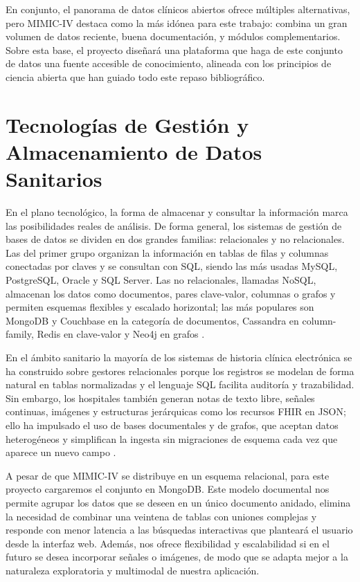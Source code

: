 \newpage
En conjunto, el panorama de datos clínicos abiertos ofrece múltiples alternativas, pero MIMIC-IV destaca como la más idónea para este trabajo: combina un gran volumen de datos reciente, buena documentación, y módulos complementarios. Sobre esta base, el proyecto diseñará una plataforma que haga de este conjunto de datos una fuente accesible de conocimiento, alineada con los principios de ciencia abierta que han guiado todo este repaso bibliográfico.


\section{Tecnologías de Gestión y Almacenamiento de Datos Sanitarios}




En el plano tecnológico, la forma de almacenar y consultar la información marca las posibilidades reales de análisis. De forma general, los sistemas de gestión de bases de datos se dividen en dos grandes familias: relacionales y no relacionales. Las del primer grupo organizan la información en tablas de filas y columnas conectadas por claves y se consultan con SQL, siendo las más usadas MySQL, PostgreSQL, Oracle y SQL Server.  Las no relacionales, llamadas NoSQL, almacenan los datos como documentos, pares clave-valor, columnas o grafos y permiten esquemas flexibles y escalado horizontal; las más populares son MongoDB y Couchbase en la categoría de documentos, Cassandra en column-family, Redis en clave-valor y Neo4j en grafos \cite{DBEngines2025}.

En el ámbito sanitario la mayoría de los sistemas de historia clínica electrónica se ha construido sobre gestores relacionales porque los registros se modelan de forma natural en tablas normalizadas y el lenguaje SQL facilita auditoría y trazabilidad.  Sin embargo, los hospitales también generan notas de texto libre, señales continuas, imágenes y estructuras jerárquicas como los recursos FHIR en JSON; ello ha impulsado el uso de bases documentales y de grafos, que aceptan datos heterogéneos y simplifican la ingesta sin migraciones de esquema cada vez que aparece un nuevo campo \cite{GAMAL2021103670,MongoFHIR}.

A pesar de que MIMIC-IV se distribuye en un esquema relacional, para este proyecto cargaremos el conjunto en MongoDB. Este modelo documental nos permite agrupar los datos que se deseen en un único documento anidado, elimina la necesidad de combinar una veintena de tablas con uniones complejas y responde con menor latencia a las búsquedas interactivas que planteará el usuario desde la interfaz web.  Además, nos ofrece flexibilidad y escalabilidad si en el futuro se desea incorporar señales o imágenes, de modo que se adapta mejor a la naturaleza exploratoria y multimodal de nuestra aplicación.


